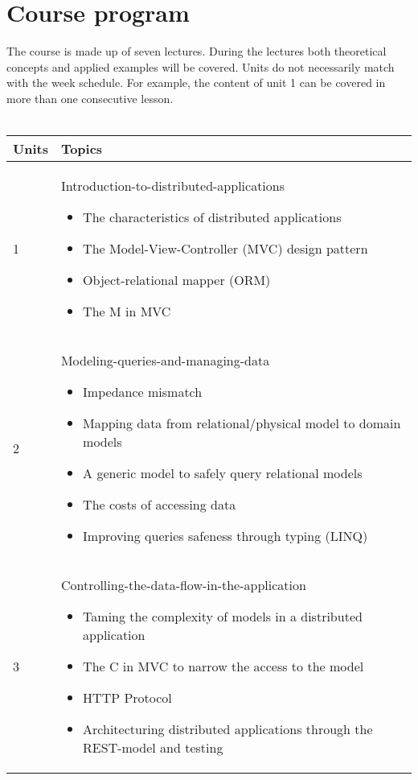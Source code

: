 \section{Course program}
The course is made up of seven lectures. During the lectures both theoretical
concepts and applied examples will be covered. Units do not necessarily match with the week schedule. For example, the content of unit 1 can be covered in more than one consecutive lesson. 
	\\
	\\
	\begin{tabular}{ | p{1.2cm} | p{10cm} | }
		\hline
	  	\textbf{Units} & \textbf{Topics} \\
	  	\hline 
  		1 & Introduction-to-distributed-applications
  			\begin{itemize}[nolistsep]
				\item The characteristics of distributed applications
				\item The Model-View-Controller (MVC) design pattern 
				\item Object-relational mapper (ORM)
				\item The M in MVC
			\end{itemize}
 		\\
  		\hline
  		2 & Modeling-queries-and-managing-data
  		\begin{itemize}[nolistsep]
					\item Impedance mismatch
					\item Mapping data from relational/physical model to domain models
					\item A generic model to safely query relational models
					\item The costs of accessing data
					\item Improving queries safeness through typing (LINQ)
				\end{itemize}
  		\\
  		\hline
  		3 & Controlling-the-data-flow-in-the-application
  		\begin{itemize}[nolistsep]
					\item Taming the complexity of models in a distributed application
					\item The C in MVC to narrow the access to the model
					\item HTTP Protocol
					\item Architecturing distributed applications through the REST-model and testing
				\end{itemize}
  		 \\

\end{tabular}
